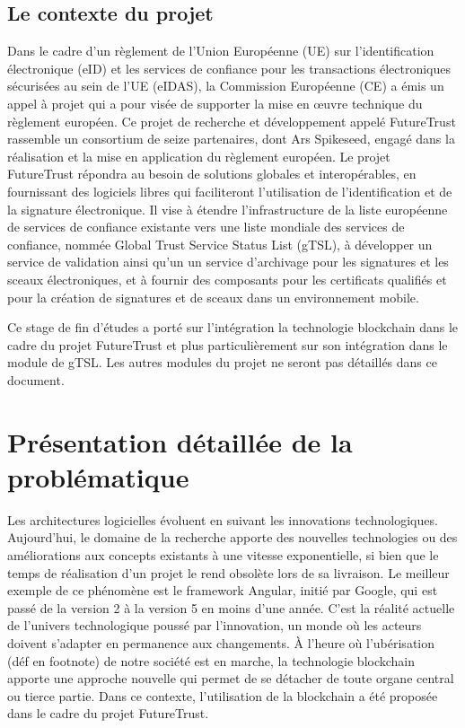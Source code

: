 \documentclass{tnreport}
\begin{document}
\section{Le contexte du projet}

Dans le cadre d'un règlement de l'Union Européenne (UE) sur l'identification électronique (eID) et les services de confiance pour les transactions électroniques sécurisées au sein de l'UE (eIDAS), la Commission Européenne (CE) a émis un appel à projet qui a pour visée de supporter la mise en œuvre technique du règlement européen. 
Ce projet de recherche et développement appelé FutureTrust rassemble un consortium de seize partenaires, dont Ar{\texteta}s Spikeseed, engagé dans la réalisation et la mise en application du règlement européen. 
Le projet FutureTrust répondra au besoin de solutions globales et interopérables, en fournissant des logiciels libres qui faciliteront l'utilisation de l'identification et de la signature électronique. 
Il vise à étendre l'infrastructure de la liste européenne de services de confiance existante vers une liste mondiale des services de confiance, nommée Global Trust Service Status List (gTSL), à développer un service de validation ainsi qu'un un service d'archivage pour les signatures et les sceaux électroniques, et à fournir des composants pour les certificats qualifiés et pour la création de signatures et de sceaux dans un environnement mobile.

Ce stage de fin d'études a porté sur l'intégration la technologie blockchain dans le cadre du projet FutureTrust et plus particulièrement sur son intégration dans le module de gTSL. Les autres modules du projet ne seront pas détaillés dans ce document. 

\chapter{Présentation détaillée de la problématique}

Les architectures logicielles évoluent en suivant les innovations technologiques. Aujourd'hui, le domaine de la recherche apporte des nouvelles technologies ou des améliorations aux concepts existants à une vitesse exponentielle, si bien que 
le temps de réalisation d'un projet le rend obsolète lors de sa livraison.
Le meilleur exemple de ce phénomène est le framework Angular, initié par Google, qui est passé de la version 2 à la version 5 en moins d'une année. C'est la réalité actuelle de l'univers technologique poussé par l'innovation, un monde où les acteurs doivent s'adapter en permanence aux changements.
À l'heure où l'ubérisation (déf en footnote) de notre société est en marche, la technologie blockchain apporte une approche nouvelle qui permet de se détacher de toute organe central ou tierce partie. Dans ce contexte, l'utilisation de la blockchain a été proposée dans le cadre du projet FutureTrust.
\end{document}
